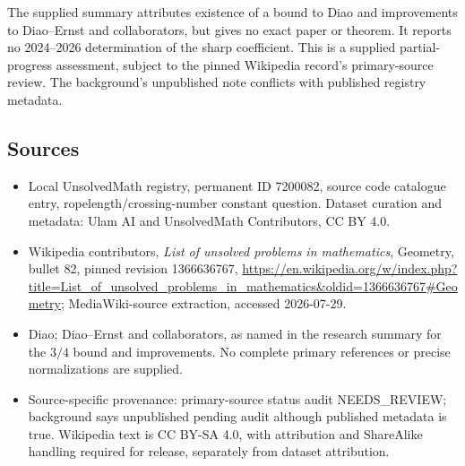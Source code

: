 \documentclass[11pt]{article}
\begin{document}
The supplied summary attributes existence of a bound to Diao and improvements to Diao--Ernst and collaborators, but gives no exact paper or theorem. It reports no 2024--2026 determination of the sharp coefficient. This is a supplied partial-progress assessment, subject to the pinned Wikipedia record's primary-source review. The background's unpublished note conflicts with published registry metadata.
\subsection{Sources}
\begin{itemize}
\item Local UnsolvedMath registry, permanent ID 7200082, source code catalogue entry, ropelength/crossing-number constant question. Dataset curation and metadata: Ulam AI and UnsolvedMath Contributors, CC BY 4.0.
\item Wikipedia contributors, \emph{List of unsolved problems in mathematics}, Geometry, bullet 82, pinned revision 1366636767, \url{https://en.wikipedia.org/w/index.php?title=List_of_unsolved_problems_in_mathematics&oldid=1366636767#Geometry}; MediaWiki-source extraction, accessed 2026-07-29.
\item Diao; Diao--Ernst and collaborators, as named in the research summary for the $3/4$ bound and improvements. No complete primary references or precise normalizations are supplied.
\item Source-specific provenance: primary-source status audit NEEDS\_REVIEW; background says unpublished pending audit although published metadata is true. Wikipedia text is CC BY-SA 4.0, with attribution and ShareAlike handling required for release, separately from dataset attribution.
\end{itemize}
\end{document}
